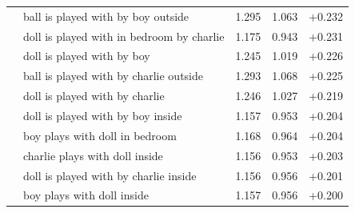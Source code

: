 \begin{longtable}{@{}llrrr@{}}
 & ball is played with by boy outside & 1.295 & 1.063 & +0.232 \\
 & doll is played with in bedroom by charlie & 1.175 & 0.943 & +0.231 \\
 & doll is played with by boy & 1.245 & 1.019 & +0.226 \\
 & ball is played with by charlie outside & 1.293 & 1.068 & +0.225 \\
 & doll is played with by charlie & 1.246 & 1.027 & +0.219 \\
 & doll is played with by boy inside & 1.157 & 0.953 & +0.204 \\
 & boy plays with doll in bedroom & 1.168 & 0.964 & +0.204 \\
 & charlie plays with doll inside & 1.156 & 0.953 & +0.203 \\
 & doll is played with by charlie inside & 1.156 & 0.956 & +0.201 \\
 & boy plays with doll inside & 1.157 & 0.956 & +0.200 \\
\end{longtable}
\normalsize
